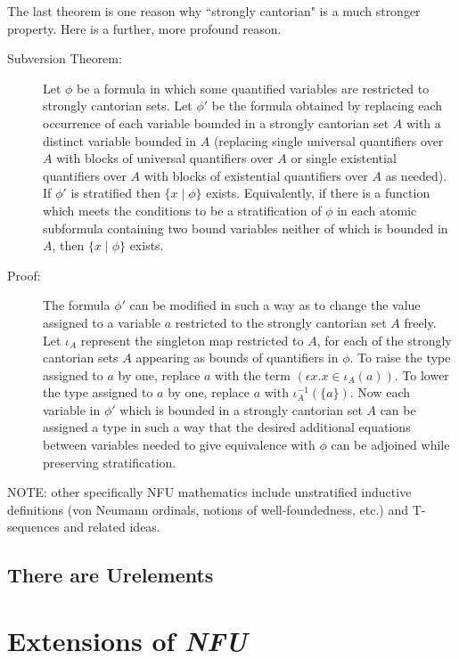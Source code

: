 \documentclass[12pt]{book}
\begin{document}
The last theorem is one reason why ``strongly cantorian" is a much stronger property.  Here is a further, more profound reason.

\begin{description}

\item[Subversion Theorem:]  Let $\phi$ be a formula in which some quantified variables are restricted to strongly cantorian sets.
Let $\phi'$ be the formula obtained by replacing each occurrence of each variable bounded in a strongly cantorian set $A$ with a distinct variable bounded in $A$
(replacing single universal quantifiers over $A$  with blocks of universal quantifiers over $A$ or single existential quantifiers over $A$ with blocks of existential quantifiers over $A$ as needed).
If $\phi'$ is stratified then $\{x \mid \phi\}$ exists.  Equivalently, if there is a function which meets the conditions to be a stratification
of $\phi$ in each atomic subformula containing two bound variables neither of which is bounded in $A$, then $\{x \mid \phi\}$ exists.

\item[Proof:]  The formula $\phi'$ can be modified in such a way as to change the value assigned to a variable $a$ restricted to the strongly cantorian set
$A$ freely.  Let $\iota_A$ represent the singleton map restricted to $A$, for each of the strongly cantorian sets $A$ appearing as bounds of quantifiers in $\phi$.   To raise the type assigned to $a$ by one, replace $a$ with the term
$(\epsilon x.x \in \iota_A(a))$.  To lower the type assigned to $a$ by one, replace $a$ with $\iota_A^{-1}(\{a\})$.  Now each variable in $\phi'$
which is bounded in a strongly cantorian set $A$ can be assigned a type in such a way that the desired additional equations between variables needed to give equivalence with $\phi$ can be adjoined while preserving stratification.

\end{description}

NOTE:  other specifically NFU mathematics include unstratified inductive definitions (von Neumann ordinals, notions of well-foundedness, etc.)
and T-sequences and related ideas.

\subsection{There are Urelements}



\section{Extensions of {\em NFU\/}}
\end{document}
